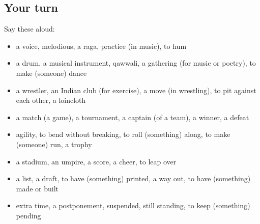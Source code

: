 \subsection*{Your turn}
Say these aloud:

\begin{itemize}
\raggedright
  \item a voice, melodious, a raga, practice (in music), to hum
  \item a drum, a musical instrument, qawwali, a gathering (for music or poetry), to make (someone) dance
  \item a wrestler, an Indian club (for exercise), a move (in wrestling), to pit against each other, a loincloth
  \item a match (a game), a tournament, a captain (of a team), a winner, a defeat
  \item agility, to bend without breaking, to roll (something) along, to make (someone) run, a trophy
  \item a stadium, an umpire, a score, a cheer, to leap over
  \item a list, a draft, to have (something) printed, a way out, to have (something) made or built
  \item extra time, a postponement, suspended, still standing, to keep (something) pending
\end{itemize}

